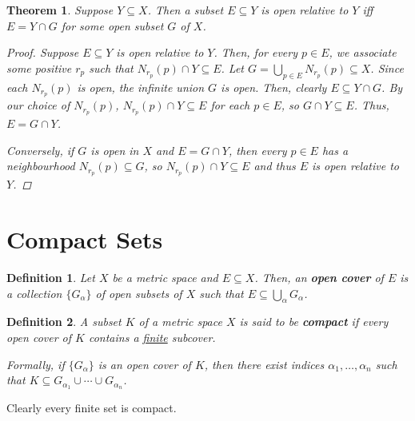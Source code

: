 \documentclass{scrbook}
\renewcommand{\underline}{\ul}
\newtheorem{theorem}{Theorem}
\newtheorem{definition}{Definition}
\begin{document}
\begin{theorem}
Suppose $Y \subseteq X$. Then a subset $E \subseteq Y$ is open relative to $Y$ iff $E = Y \cap G$ for some open subset $G$ of $X$. 

\begin{proof}
Suppose $E \subseteq Y$ is open relative to $Y$. Then, for every $p \in E$, we associate some positive $r_p$ such that $N_{r_p}(p) \cap Y \subseteq E$. Let $G = \bigcup_{p \in E} N_{r_p}(p) \subseteq X$. Since each $N_{r_p}(p)$ is open, the infinite union $G$ is open. Then, clearly $E \subseteq Y \cap G$. By our choice of $N_{r_p}(p)$, $N_{r_p}(p) \cap Y \subseteq E$ for each $p \in E$, so $G \cap Y \subseteq E$. Thus, $E = G \cap Y$. 

Conversely, if $G$ is open in $X$ and $E = G \cap Y$, then every $p \in E$ has a neighbourhood $N_{r_p}(p) \subseteq G$, so $N_{r_p}(p) \cap Y \subseteq E$ and thus $E$ is open relative to $Y$.
\end{proof}
\end{theorem}

\section{Compact Sets}

\begin{definition}
Let $X$ be a metric space and $E \subseteq X$. Then, an \textbf{open cover} of $E$ is a collection $\{G_\alpha\}$ of open subsets of $X$ such that $E \subseteq \bigcup_\alpha G_\alpha$. 
\end{definition}

\begin{definition}
A subset $K$ of a metric space $X$ is said to be \textbf{compact} if every open cover of $K$ contains a \underline{finite} subcover.

Formally, if $\{G_\alpha\}$ is an open cover of $K$, then there exist indices $\alpha_1, \dotsc, \alpha_n$ such that $K \subseteq G_{\alpha_1} \cup \dotsb \cup G_{\alpha_n}$. 

\end{definition}

Clearly every finite set is compact. 
\end{document}
